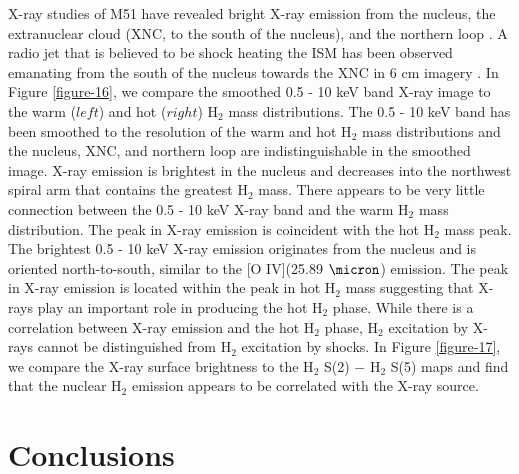 \documentclass[12pt,preprint]{aastex}
\begin{document}
X-ray studies of M51 have revealed bright X-ray emission from 
the nucleus, the extranuclear cloud (XNC, to the south of the nucleus), 
and the northern loop \citep{wil01,mad07}.  A radio jet that is believed to be shock heating 
the ISM has been observed emanating from the south of the nucleus 
towards the XNC in 6 cm imagery \citep{cra92}.  In Figure \ref{figure-16}, 
we compare the smoothed 0.5 - 10 keV band X-ray
image to the warm ($left$) and hot ($right$) H$_2$ mass
distributions.  The 0.5 - 10 keV band has been smoothed to the
resolution of the warm and hot H$_2$ mass distributions and
the nucleus, XNC, and northern loop are indistinguishable in the
smoothed image.  X-ray emission is brightest in the nucleus and
decreases into the northwest spiral arm that contains the greatest
H$_2$ mass.  There appears to be very little connection
between the 0.5 - 10 keV X-ray band and the warm H$_2$ mass
distribution.  The peak in X-ray emission is coincident with the hot H$_2$
mass peak. The brightest 0.5 - 10 keV X-ray emission originates
from the nucleus and is oriented north-to-south, similar to the [O
  IV](25.89 $\micron$) emission.  The peak in X-ray emission is
located within the peak in hot H$_2$ mass suggesting that
X-rays play an important role in producing the hot H$_2$
phase.  While there is a correlation between X-ray emission and the
hot H$_2$ phase, H$_2$ excitation by X-rays cannot
be distinguished from H$_2$ excitation by shocks. In Figure 
\ref{figure-17}, we compare the X-ray surface brightness to the H$_2$ S(2) $-$ 
H$_2$ S(5) maps and find that the nuclear H$_2$ emission 
appears to be correlated with the X-ray source.

\section{Conclusions}
\end{document}
